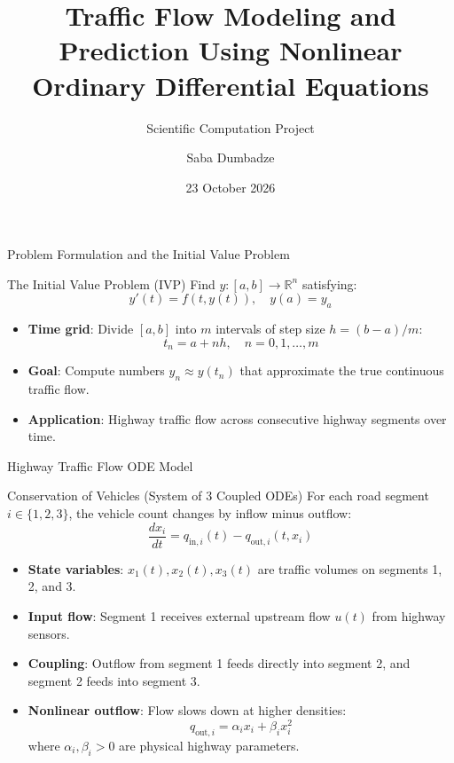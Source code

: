 \documentclass[aspectratio=169,10pt]{beamer}
\title[Traffic Flow ODE Modeling]{Traffic Flow Modeling and Prediction Using Nonlinear Ordinary Differential Equations}
\subtitle{Scientific Computation Project}
\author[Saba Dumbadze]{Saba Dumbadze}
\institute[KIU]{Scientific Computation \\ Kutaisi International University}
\date{23 October 2026}
\begin{document}
\begin{frame}
  \titlepage
\end{frame}

\begin{frame}{Problem Formulation and the Initial Value Problem}
  \begin{block}{The Initial Value Problem (IVP)}
    Find $y : [a, b] \to \mathbb{R}^n$ satisfying:
    \[
      y'(t) = f(t, y(t)), \quad y(a) = y_a
    \]
  \end{block}

  \begin{itemize}
    \item \textbf{Time grid}: Divide $[a, b]$ into $m$ intervals of step size $h = (b-a)/m$:
    \[
      t_n = a + n h, \quad n = 0, 1, \dots, m
    \]
    \item \textbf{Goal}: Compute numbers $y_n \approx y(t_n)$ that approximate the true continuous traffic flow.
    \item \textbf{Application}: Highway traffic flow across consecutive highway segments over time.
  \end{itemize}
\end{frame}

\begin{frame}{Highway Traffic Flow ODE Model}
  \begin{block}{Conservation of Vehicles (System of 3 Coupled ODEs)}
    For each road segment $i \in \{1, 2, 3\}$, the vehicle count changes by inflow minus outflow:
    \[
      \frac{d x_i}{dt} = q_{\text{in}, i}(t) - q_{\text{out}, i}(t, x_i)
    \]
  \end{block}

  \begin{itemize}
    \item \textbf{State variables}: $x_1(t), x_2(t), x_3(t)$ are traffic volumes on segments 1, 2, and 3.
    \item \textbf{Input flow}: Segment 1 receives external upstream flow $u(t)$ from highway sensors.
    \item \textbf{Coupling}: Outflow from segment 1 feeds directly into segment 2, and segment 2 feeds into segment 3.
    \item \textbf{Nonlinear outflow}: Flow slows down at higher densities:
    \[
      q_{\text{out}, i} = \alpha_i x_i + \beta_i x_i^2
    \]
    where $\alpha_i, \beta_i > 0$ are physical highway parameters.
  \end{itemize}
\end{frame}
\end{document}
